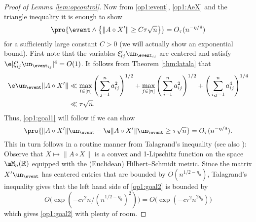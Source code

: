 \documentclass[aop,preprint]{imsart}
\theoremstyle{plain}
\theoremstyle{definition}
\theoremstyle{remark}
\numberwithin{equation}{section}
\numberwithin{theorem}{section}
\begin{document}
\begin{proof}[Proof of Lemma \ref{lem:opcontrol}]
Now from \eqref{op1:event}, \eqref{op1:AeX} and the triangle inequality it is enough to show
\begin{equation}	\label{op1:goal1}
\pro{\event \wedge\big\{ \|A\circ X'\| \ge C\tau \sqrt{n} \big\}} = O_\tau(n^{-\eta/8})
\end{equation}
for a sufficiently large constant $C>0$ (we will actually show an exponential bound).
First note that the variables $\xi_{ij}'\un_{\event_{ij}}$ are centered and satisfy $\e |\xi_{ij}'\un_{\event_{ij}}|^4 = O(1)$. 
It follows from Theorem \ref{thm:latala} that
\begin{align*}
\e\un_\event  \|A\circ X'\|
&\ll 
\max_{i\in [n]} \Bigg( \sum_{j=1}^n  a_{ij}^2 \Bigg)^{1/2} + \max_{j\in [n]} \Bigg(\sum_{i=1}^n  a_{ij}^2 \Bigg)^{1/2} + \Bigg( \sum_{i,j=1}^n  a_{ij}^4\Bigg)^{1/4}\\
&\ll \tau \sqrt{n}.
\end{align*}
Thus, \eqref{op1:goal1} will follow if we can show
\begin{equation}	\label{op1:goal2}
\pro{ \|A\circ X'\|\un_\event  - \e \|A\circ X'\| \un_\event\ge \tau \sqrt{n} } = O_\tau(n^{-\eta/8}).
\end{equation}
This in turn follows in a routine manner from Talagrand's inequality \cite[Theorem 6.6]{Talagrand:newlook} (see also \cite[Corollary 4.4.11]{AGZ:book}): 
Observe that $X\mapsto \|A\circ X\|$ is a convex and 1-Lipschitz function on the space $\mM_n(\R)$ equipped with the (Euclidean) Hilbert--Schmidt metric. 
Since the matrix $X'\un_\event$ has centered entries that are bounded by $O(n^{1/2-\eta_0})$, Talagrand's inequality gives that the left hand side of \eqref{op1:goal2} is bounded by 
\begin{equation}
O\big(\exp(-c\tau^2 n/(n^{1/2-\eta_0})^2)\big) = O\big( \exp(-c \tau^2 n^{2\eta_0})\big) 
\end{equation}
which gives \eqref{op1:goal2} with plenty of room.


\end{proof}
\end{document}
